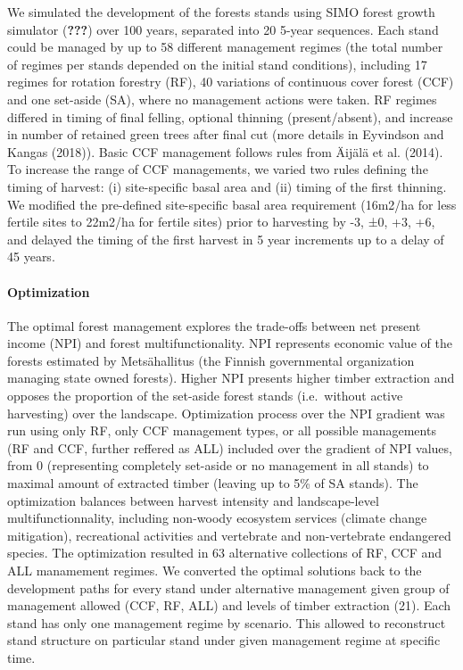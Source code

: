 \documentclass[]{elsarticle} %
\begin{document}
We simulated the development of the forests stands using SIMO forest
growth simulator ({\textbf{???}}) over 100 years, separated into 20
5-year sequences. Each stand could be managed by up to 58 different
management regimes (the total number of regimes per stands depended on
the initial stand conditions), including 17 regimes for rotation
forestry (RF), 40 variations of continuous cover forest (CCF) and one
set-aside (SA), where no management actions were taken. RF regimes
differed in timing of final felling, optional thinning (present/absent),
and increase in number of retained green trees after final cut (more
details in Eyvindson and Kangas (2018)). Basic CCF management follows
rules from Äijälä et al. (2014). To increase the range of CCF
managements, we varied two rules defining the timing of harvest: (i)
site-specific basal area and (ii) timing of the first thinning. We
modified the pre-defined site-specific basal area requirement (16m2/ha
for less fertile sites to 22m2/ha for fertile sites) prior to harvesting
by -3, ±0, +3, +6, and delayed the timing of the first harvest in 5 year
increments up to a delay of 45 years.

\paragraph{Optimization}\label{optimization}

The optimal forest management explores the trade-offs between net
present income (NPI) and forest multifunctionality. NPI represents
economic value of the forests estimated by Metsähallitus (the Finnish
governmental organization managing state owned forests). Higher NPI
presents higher timber extraction and opposes the proportion of the
set-aside forest stands (i.e.~without active harvesting) over the
landscape. Optimization process over the NPI gradient was run using only
RF, only CCF management types, or all possible managements (RF and CCF,
further reffered as ALL) included over the gradient of NPI values, from
0 (representing completely set-aside or no management in all stands) to
maximal amount of extracted timber (leaving up to 5\% of SA stands). The
optimization balances between harvest intensity and landscape-level
multifunctionnality, including non-woody ecosystem services (climate
change mitigation), recreational activities and vertebrate and
non-vertebrate endangered species. The optimization resulted in 63
alternative collections of RF, CCF and ALL manamement regimes. We
converted the optimal solutions back to the development paths for every
stand under alternative management given group of management allowed
(CCF, RF, ALL) and levels of timber extraction (21). Each stand has only
one management regime by scenario. This allowed to reconstruct stand
structure on particular stand under given management regime at specific
time.
\end{document}
